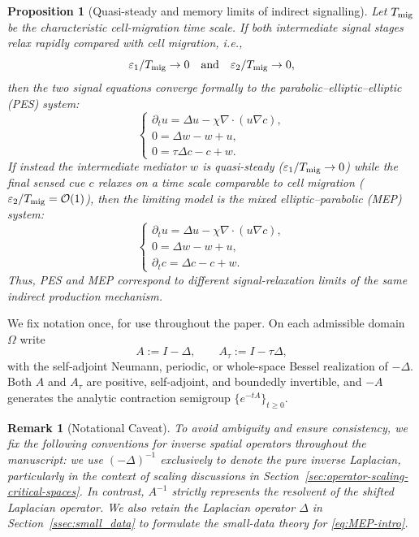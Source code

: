 \documentclass[pdflatex,sn-mathphys-num]{sn-jnl}%
\theoremstyle{thmstyleone}
\newtheorem{proposition}[theorem]{Proposition}%
\theoremstyle{thmstyletwo}
\newtheorem{remark}{Remark}
\theoremstyle{thmstylethree}
\begin{document}
\begin{proposition}[Quasi-steady and memory limits of indirect signalling]
Let \(T_{\rm mig}\) be the characteristic cell-migration time scale.  If both intermediate signal stages relax rapidly compared with cell migration, i.e.,
\[
    \varepsilon_1/T_{\rm mig}\to 0 \quad \text{and} \quad \varepsilon_2/T_{\rm mig}\to 0,
\]
then the two signal equations converge formally to the parabolic--elliptic--elliptic (PES) system:
\begin{equation}
\label{eq:PES-intro}
\begin{cases}
    \partial_t u=\Delta u-\chi\nabla\cdot(u\nabla c),\\
    0=\Delta w-w+u,\\
    0=\tau\Delta c-c+w.
\end{cases}
\tag{PES}
\end{equation}
If instead the intermediate mediator \(w\) is quasi-steady (\(\varepsilon_1/T_{\rm mig}\to 0\)) while the final sensed cue \(c\) relaxes on a time scale comparable to cell migration (\(\varepsilon_2/T_{\rm mig}=\mathcal O(1)\)), then the limiting model is the mixed elliptic--parabolic (MEP) system:
\begin{equation}
\label{eq:MEP-intro}
\begin{cases}
    \partial_t u=\Delta u-\chi\nabla\cdot(u\nabla c),\\
    0=\Delta w-w+u,\\
    \partial_t c=\Delta c-c+w.
\end{cases}
\tag{MEP}
\end{equation}
Thus, PES and MEP correspond to different signal-relaxation limits of the same indirect production mechanism.
\end{proposition}

We fix notation once, for use throughout the paper. On each admissible domain
\(\Omega\) write
\begin{equation}
\label{eq:operator-conventions}
        A:=I-\Delta,\qquad A_\tau:=I-\tau\Delta,
\end{equation}
with the self-adjoint Neumann, periodic, or whole-space Bessel realization of
\(-\Delta\). Both \(A\) and \(A_\tau\) are positive, self-adjoint, and
boundedly invertible, and \(-A\) generates the analytic contraction semigroup
\(\{e^{-tA}\}_{t\ge0}\). 

\begin{remark}[Notational Caveat]\label{rmk:notation}
    To avoid ambiguity and ensure consistency, we fix the following conventions for inverse spatial operators throughout the manuscript: we use $(-\Delta)^{-1}$ exclusively to denote the pure inverse Laplacian, particularly in the context of scaling discussions in Section~\ref{sec:operator-scaling-critical-spaces}. In contrast, $A^{-1}$ strictly represents the resolvent of the shifted Laplacian operator. We also retain the Laplacian operator $\Delta$ in Section~\ref{ssec:small_data} to formulate the small-data theory for \eqref{eq:MEP-intro}. 
\end{remark}
\end{document}
